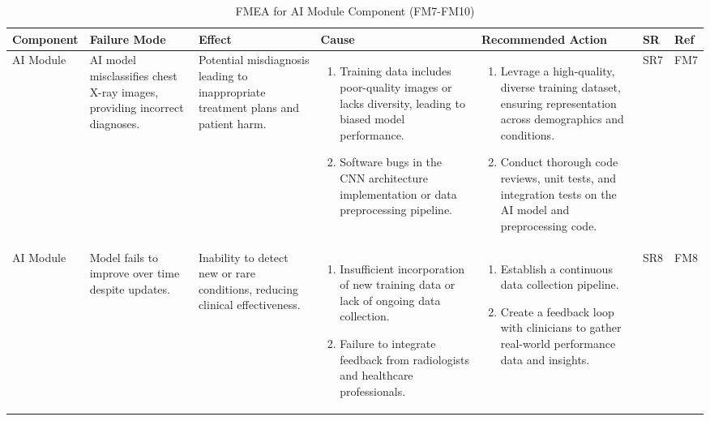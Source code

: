 \documentclass{article}
\begin{document}
\begin{landscape}
    \begin{table}[ht]
    \centering
    \caption{FMEA for AI Module Component (FM7-FM10)}
    \renewcommand{\arraystretch}{1.1}
    {
    \setlength{\tabcolsep}{2pt}
    \begin{tabular}{|p{2.5cm}|p{2.5cm}|p{3cm}|p{5cm}|p{6cm}|p{1cm}|p{1cm}|}
    \hline
    \textbf{Component} & \textbf{Failure Mode} & \textbf{Effect} & \textbf{Cause} & \textbf{Recommended Action} & \textbf{SR} & \textbf{Ref} \\
    \hline

    AI Module
     & AI model misclassifies chest X-ray images, providing incorrect diagnoses.
     & Potential misdiagnosis leading to inappropriate treatment plans and patient harm.
     &
     \begin{enumerate}[leftmargin=*, label={\alph*.}, itemsep=1pt]
         \item Training data includes poor-quality images or lacks diversity, leading to biased model performance.
         \item Software bugs in the CNN architecture implementation or data preprocessing pipeline.
     \end{enumerate}
     &
     \begin{enumerate}[leftmargin=*, label={\alph*.}, itemsep=1pt]
         \item Levrage a high-quality, diverse training dataset, ensuring representation across demographics and conditions.
         \item Conduct thorough code reviews, unit tests, and integration tests on the AI model and preprocessing code.
     \end{enumerate}
     & SR7 & FM7 \\ \hline

    AI Module
     & Model fails to improve over time despite updates.
     & Inability to detect new or rare conditions, reducing clinical effectiveness.
     &
     \begin{enumerate}[leftmargin=*, label={\alph*.}, itemsep=1pt]
         \item Insufficient incorporation of new training data or lack of ongoing data collection.
         \item Failure to integrate feedback from radiologists and healthcare professionals.
     \end{enumerate}
     &
     \begin{enumerate}[leftmargin=*, label={\alph*.}, itemsep=1pt]
         \item Establish a continuous data collection pipeline.
         \item Create a feedback loop with clinicians to gather real-world performance data and insights.
     \end{enumerate}
     & SR8 & FM8 \\ \hline


\end{tabular}}
\end{table}
\end{landscape}
\end{document}
